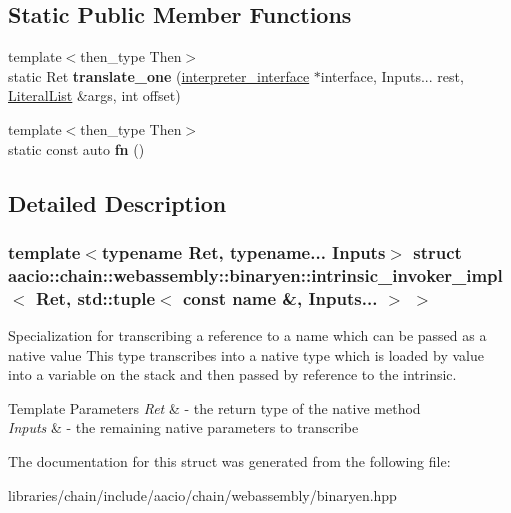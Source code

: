 \subsection*{Static Public Member Functions}
\begin{DoxyCompactItemize}
\item 
\mbox{\label{structaacio_1_1chain_1_1webassembly_1_1binaryen_1_1intrinsic__invoker__impl_3_01_ret_00_01std_1_5163181577c78115845d25e4011d3b90_a2e2c973ee6f1c883e510c26642b3af25}} 
{\footnotesize template$<$then\+\_\+type Then$>$ }\\static Ret {\bfseries translate\+\_\+one} (\mbox{\hyperlink{structaacio_1_1chain_1_1webassembly_1_1binaryen_1_1interpreter__interface}{interpreter\+\_\+interface}} $\ast$interface, Inputs... rest, \mbox{\hyperlink{classstd_1_1vector}{Literal\+List}} \&args, int offset)
\item 
\mbox{\label{structaacio_1_1chain_1_1webassembly_1_1binaryen_1_1intrinsic__invoker__impl_3_01_ret_00_01std_1_5163181577c78115845d25e4011d3b90_ac75243d3c21a6a7ab54db992d55b86d7}} 
{\footnotesize template$<$then\+\_\+type Then$>$ }\\static const auto {\bfseries fn} ()
\end{DoxyCompactItemize}


\subsection{Detailed Description}
\subsubsection*{template$<$typename Ret, typename... Inputs$>$\newline
struct aacio\+::chain\+::webassembly\+::binaryen\+::intrinsic\+\_\+invoker\+\_\+impl$<$ Ret, std\+::tuple$<$ const name \&, Inputs... $>$ $>$}

Specialization for transcribing a reference to a name which can be passed as a native value This type transcribes into a native type which is loaded by value into a variable on the stack and then passed by reference to the intrinsic.


\begin{DoxyTemplParams}{Template Parameters}
{\em Ret} & -\/ the return type of the native method \\
\hline
{\em Inputs} & -\/ the remaining native parameters to transcribe \\
\hline
\end{DoxyTemplParams}


The documentation for this struct was generated from the following file\+:\begin{DoxyCompactItemize}
\item 
libraries/chain/include/aacio/chain/webassembly/binaryen.\+hpp\end{DoxyCompactItemize}
